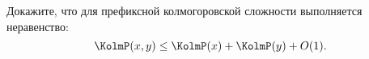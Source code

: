 Докажите, что для префиксной колмогоровской сложности выполняется неравенство:
$$\KolmP(x,y) \le \KolmP(x) + \KolmP(y) + O(1).$$